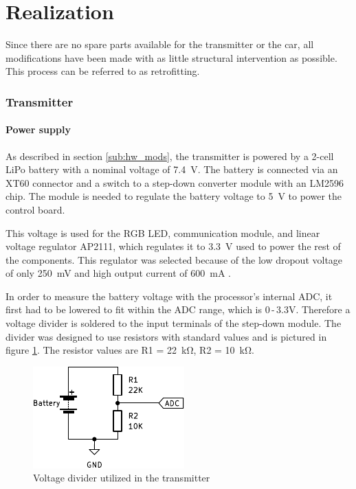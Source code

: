 


\part{Realization}
\label{chap:realization}
Since there are no spare parts available for the transmitter or the car, all modifications have been made with as little structural intervention as possible. This process can be referred to as retrofitting.

\section{Transmitter}
\label{sec:real_tx}
\subsection{Power supply}
As described in section \ref{sub:hw_mods}, the transmitter is powered by a 2-cell LiPo battery with a nominal voltage of \SI{7.4}{\V}. The battery is connected via an XT60 connector and a switch to a step-down converter module with an LM2596 chip. The module is needed to regulate the battery voltage to \SI{5}{\V} to power the control board.

This voltage is used for the RGB LED, communication module, and linear voltage regulator AP2111, which regulates it to \SI{3.3}{\V} used to power the rest of the components. This regulator was selected because of the low dropout voltage of only \SI{250}{\mV} and high output current of \SI{600}{\mA} \cite{ap_datasheet}.		%

In order to measure the battery voltage with the processor's internal ADC, it first had to be lowered to fit within the ADC range, which is $0\, \text{-}\, 3.3$\unit{\V}. Therefore a voltage divider is soldered to the input terminals of the step-down module. The divider was designed to use resistors with standard values and is pictured in figure \ref{fig:tx_div}. The resistor values are R1 = \SI{22}{\kohm}, R2 = \SI{10}{\kohm}.
\begin{figure}[ht]
\centering
\includegraphics[width=0.4\linewidth]{fig/voltage_divider.pdf}
\caption{Voltage divider utilized in the transmitter }
\label{fig:tx_div}
\end{figure}


